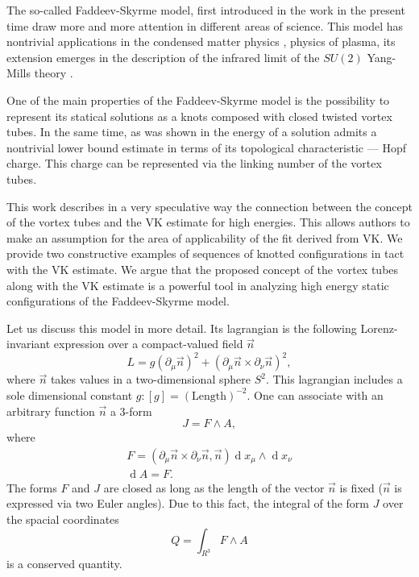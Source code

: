 \documentclass[a4paper,12pt]{article}
\DeclareMathOperator{\dd}{d}
\newcommand{\prm}{\partial_{\mu}}
\newcommand{\prn}{\partial_{\nu}}
\begin{document}
        The so-called Faddeev-Skyrme model, first introduced in the
        work 
\cite{} 
        in the present time draw more and more attention in different areas
        of science.
        This model has nontrivial applications in the condensed matter 
        physics
\cite{},
        physics of plasma, its extension emerges in the description
        of the infrared limit of the 
    $ SU(2) $
        Yang-Mills theory
\cite{}.

        One of the main properties of the Faddeev-Skyrme model is the
        possibility to represent its statical solutions as a knots 
        composed with closed twisted vortex tubes.
        In the same time, as was shown in
\cite{VK}
        the energy of a solution admits a nontrivial
        lower bound estimate in terms of its topological characteristic
        --- Hopf charge. This charge can be represented via
        the linking number of the vortex tubes.

        This work describes in a very speculative way 
        the connection between the concept of the vortex tubes and the
        VK estimate for high energies. 
        This allows authors to make an assumption for the 
        area of applicability of the fit derived from VK. 
        We provide two constructive examples of sequences of
	knotted configurations
        in tact with the VK estimate.
	We argue that the proposed concept of the vortex
	tubes along with the VK estimate is a powerful tool in
	analyzing high energy static configurations of the
	Faddeev-Skyrme model.

        Let us discuss this model in more detail.
        Its lagrangian is the following Lorenz-invariant expression
        over a compact-valued field 
    $ \vec{n} $
\begin{equation}
    L = g (\prm \vec{n})^{2} + (\prm \vec{n} \times \prn \vec{n})^{2} ,
\end{equation}
        where 
    $ \vec{n} $ 
        takes values in a two-dimensional sphere 
    $ S^{2} $.
        This lagrangian includes a sole dimensional constant 
    $ g : [g] = (\text{Length})^{-2}$.
        One can associate with an arbitrary function 
    $ \vec{n} $ 
        a  3-form
\begin{equation}
    J = F \wedge A ,
\end{equation}
        where
\begin{gather}
    F = (\prm \vec{n} \times \prn \vec{n} , \vec{n}) \dd x_{\mu} 
        \wedge \dd x_{\nu}
\\
    \dd A = F .
\end{gather}
        The forms 
    $ F $ and 
    $ J $
        are closed as long as the length of the vector
    $ \vec{n} $ 
        is fixed 
    ($ \vec{n} $ 
        is expressed via two Euler angles).
        Due to this fact, the integral of the form
    $ J $
	over the spacial coordinates
\begin{equation}
\label{HC}
    Q = \int_{R^{3}} F \wedge A
\end{equation}
        is a conserved quantity.
\end{document}
